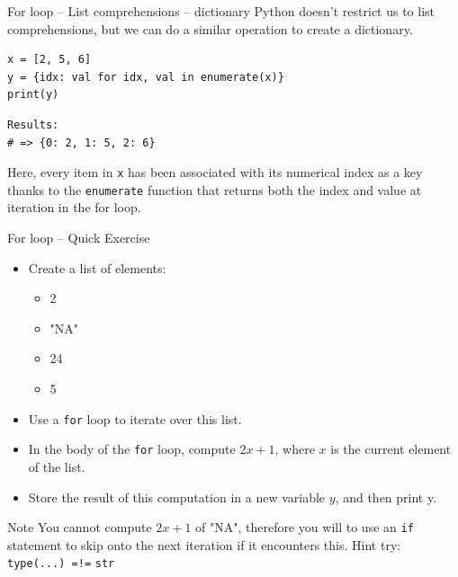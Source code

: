 \documentclass[10pt]{beamer}
\begin{document}
\begin{frame}[label={sec:org1030df7},fragile]{For loop -- List comprehensions -- dictionary}
 Python doesn't restrict us to list comprehensions, but we can do a similar
operation to create a dictionary.

\begin{verbatim}
x = [2, 5, 6]
y = {idx: val for idx, val in enumerate(x)}
print(y)
\end{verbatim}

\begin{verbatim}
Results: 
# => {0: 2, 1: 5, 2: 6}
\end{verbatim}


Here, every item in \texttt{x} has been associated with its numerical index as a key thanks to
the \texttt{enumerate} function that returns both the index and value at iteration in the for loop.
\end{frame}


\begin{frame}[label={sec:orga7c0f00},fragile]{For loop -- Quick Exercise}
 \begin{itemize}
\item Create a list of elements:

\begin{itemize}
\item 2
\item "NA"
\item 24
\item 5
\end{itemize}

\item Use a \texttt{for} loop to iterate over this list.
\item In the body of the \texttt{for} loop, compute \(2x + 1\), where \(x\) is the current element of
the list.
\item Store the result of this computation in a new variable \(y\), and then print y.
\end{itemize}

\alert{Note} You cannot compute \(2x + 1\) of "NA", therefore you will to use an \texttt{if} statement
to skip onto the next iteration if it encounters this. \alert{Hint} try: \texttt{type(...) =!=} \texttt{str}
\end{frame}
\end{document}
